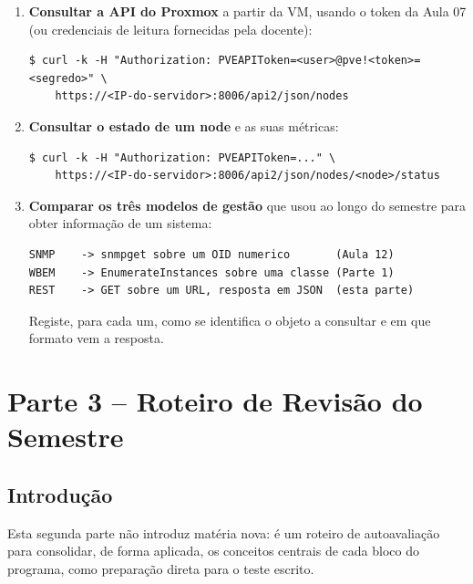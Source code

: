 \documentclass[11pt,a4paper]{article}
\begin{document}
\begin{enumerate}[label=\arabic*.]
  \item \textbf{Consultar a API do Proxmox} a partir da VM, usando o token da Aula 07 (ou credenciais de leitura fornecidas pela docente):
\begin{lstlisting}
$ curl -k -H "Authorization: PVEAPIToken=<user>@pve!<token>=<segredo>" \
    https://<IP-do-servidor>:8006/api2/json/nodes
\end{lstlisting}

  \item \textbf{Consultar o estado de um node} e as suas métricas:
\begin{lstlisting}
$ curl -k -H "Authorization: PVEAPIToken=..." \
    https://<IP-do-servidor>:8006/api2/json/nodes/<node>/status
\end{lstlisting}

  \item \textbf{Comparar os três modelos de gestão} que usou ao longo do semestre para obter informação de um sistema:
\begin{lstlisting}
SNMP    -> snmpget sobre um OID numerico       (Aula 12)
WBEM    -> EnumerateInstances sobre uma classe (Parte 1)
REST    -> GET sobre um URL, resposta em JSON  (esta parte)
\end{lstlisting}
  Registe, para cada um, como se identifica o objeto a consultar e em que formato vem a resposta.
\end{enumerate}

\section{Parte 3 -- Roteiro de Revisão do Semestre}

\subsection{Introdução}
Esta segunda parte não introduz matéria nova: é um roteiro de autoavaliação para consolidar, de forma aplicada, os conceitos centrais de cada bloco do programa, como preparação direta para o teste escrito.
\end{document}
